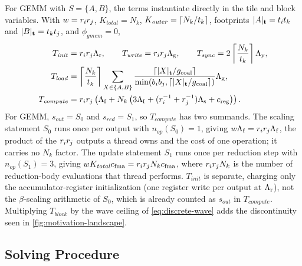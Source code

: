 For GEMM with \(S=\{A,B\}\), the terms instantiate directly in the tile and block variables. With \(w=r_ir_j\), \(K_{\mathit{total}}=N_k\), \(K_{\mathit{outer}}=\lceil N_k/t_k\rceil\), footprints \(|A|_{\mathbf{t}}=t_it_k\) and \(|B|_{\mathbf{t}}=t_kt_j\), and \(\phi_{\mathit{gmem}}=0\),
\[
\begin{aligned}
T_{\mathit{init}} &= r_ir_j\Lambda_{\mathrm r},
\qquad
T_{\mathit{write}} = r_ir_j\Lambda_{\mathrm g},
\qquad
T_{\mathit{sync}} = 2\left\lceil\frac{N_k}{t_k}\right\rceil\Lambda_{\mathrm y},\\
T_{\mathit{load}} &= \left\lceil\frac{N_k}{t_k}\right\rceil
   \sum_{X\in\{A,B\}}
   \frac{\lceil |X|_{\mathbf{t}}/g_{\mathrm{coal}}\rceil}
   {\min(b_i b_j,\lceil |X|_{\mathbf{t}}/g_{\mathrm{coal}}\rceil)}
   \Lambda_{\mathrm g},\\
T_{\mathit{compute}} &= r_ir_j
   \left(
   \Lambda_{\mathrm f}
   + N_k\left(3\Lambda_{\mathrm f}+(r_i^{-1}+r_j^{-1})\Lambda_{\mathrm s}+c_{\mathrm{reg}}\right)
   \right).
\end{aligned}
\]
For GEMM, \(s_{\mathit{out}}=S_0\) and \(s_{\mathit{red}}=S_1\), so \(T_{\mathit{compute}}\) has two summands. The scaling statement \(S_0\) runs once per output with \(n_{\mathit{op}}(S_0)=1\), giving \(w\Lambda_{\mathrm f}=r_ir_j\Lambda_{\mathrm f}\), the product of the \(r_ir_j\) outputs a thread owns and the cost of one operation; it carries no \(N_k\) factor. The update statement \(S_1\) runs once per reduction step with \(n_{\mathit{op}}(S_1)=3\), giving \(w K_{\mathit{total}}c_{\mathrm{fma}}=r_ir_jN_kc_{\mathrm{fma}}\), where \(r_ir_jN_k\) is the number of reduction-body evaluations that thread performs. \(T_{\mathit{init}}\) is separate, charging only the accumulator-register initialization (one register write per output at \(\Lambda_{\mathrm r}\)), not the \(\beta\)-scaling arithmetic of \(S_0\), which is already counted as \(s_{\mathit{out}}\) in \(T_{\mathit{compute}}\). Multiplying \(T_{\mathit{block}}\) by the wave ceiling of \autoref{eq:discrete-wave} adds the discontinuity seen in \autoref{fig:motivation-landscape}.

\subsection{Solving Procedure}
\label{sec:solver}
\label{sec:two-stage-solver}

